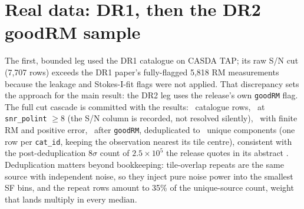 \documentclass[twocolumn]{aastex631}
\newcommand{\code}[1]{\texttt{#1}}
\begin{document}
\section{Real data: DR1, then the DR2 goodRM sample}
The first, bounded leg used the DR1 catalogue on CASDA TAP; its raw S/N cut (7{,}707 rows)
exceeds the DR1 paper's fully-flagged 5{,}818 RM measurements \citep{thomson2023} because the
leakage and Stokes-I-fit flags were not applied. That discrepancy sets the approach for the
main result: the DR2 leg uses the release's own \code{goodRM} flag. The full cut cascade is
committed with the results: \rmsRealNRowsRaw\ catalogue rows, \rmsRealNAfterSnr\ at
\code{snr\_polint} $\ge 8$ (the S/N column is recorded, not resolved silently),
\rmsRealNAfterFinite\ with finite RM and positive error, \rmsRealNAfterGoodrm\ after
\code{goodRM}, deduplicated to \rmsRealN\ unique components (one row per \code{cat\_id}, keeping
the observation nearest its tile centre), consistent with the post-deduplication 8$\sigma$
count of $2.5\times10^5$ the release quotes in its abstract \citep{spiceracs_dr2}.
Deduplication matters beyond bookkeeping: tile-overlap repeats are the same source with
independent noise, so they inject pure noise power into the smallest SF bins, and the repeat
rows amount to 35\% of the unique-source count, weight that lands multiply in every median.
\end{document}
